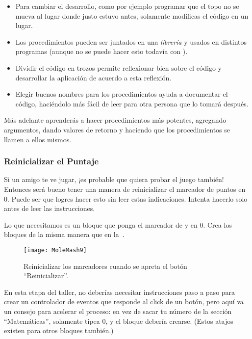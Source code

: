 {\begin{itemize}
\item Para cambiar el desarrollo, como por ejemplo programar que el
  topo no se mueva al lugar donde justo estuvo antes, solamente
  modificas el código en un lugar.

\item Los procedimientos pueden ser juntados en una \emph{librería} y
  usados en distintos programas (aunque no se puede hacer esto todavía
  con \AppInventor).

\item Dividir el código en trozos permite reflexionar bien sobre el
  código y desarrollar la aplicación de acuerdo a esta reflexión.

\item Elegir buenos nombres para los procedimientos ayuda a documentar
  el código, haciéndolo más fácil de leer para otra persona que lo
  tomará después.

\end{itemize}

Más adelante aprenderás a hacer procedimientos más potentes, agregando
argumentos, dando valores de retorno y haciendo que los procedimientos
se llamen a ellos mismos.

\subsubsection*{Reinicializar el Puntaje}

Si un amigo te ve jugar, ¡es probable que quiera probar el juego
también! Entonces será bueno tener una manera de reinicializar el
marcador de puntos en 0. Puede ser que logres hacer esto sin leer
estas indicaciones. Intenta hacerlo solo antes de leer las
instrucciones.

Lo que necesitamos es un bloque  que
ponga el marcador de  y
 en 0. Crea los bloques de la
misma manera que en la~.

\begin{figure}[H]
\centering
\texttt{[image: MoleMash9]}
\caption{Reinicializar los marcadores cuando se apreta el
botón ``Reinicializar''.}
\label{fig:MoleMash9}
\end{figure}

En esta etapa del taller, no deberías necesitar instrucciones paso a
paso para crear un controlador de eventos que responde al click de un
botón, pero aquí va un consejo para acelerar el proceso: en vez de
sacar tu número de la sección ``Matemáticas'', solamente tipea 0, y el
bloque debería crearse. (Estos atajos existen para otros bloques
también.)

}
